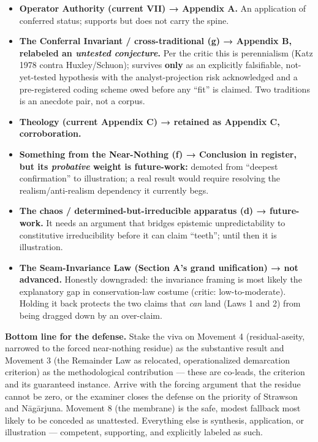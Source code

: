 \documentclass[11pt]{article}
\begin{document}
\begin{itemize}
\item \textbf{Operator Authority (current VII) → Appendix A.} An application of conferred status; supports but does not carry the spine.
\item \textbf{The Conferral Invariant /\allowbreak{} cross-traditional (g) → Appendix B, relabeled an \emph{untested conjecture}.} Per the critic this is perennialism (Katz 1978 contra Huxley/\allowbreak{}Schuon); survives \textbf{only} as an explicitly falsifiable, not-yet-tested hypothesis with the analyst-projection risk acknowledged and a pre-registered coding scheme owed before any ``fit'' is claimed. Two traditions is an anecdote pair, not a corpus.
\item \textbf{Theology (current Appendix C) → retained as Appendix C, corroboration.}
\item \textbf{Something from the Near-Nothing (f) → Conclusion in register, but its \emph{probative} weight is future-work:} demoted from ``deepest confirmation'' to illustration; a real result would require resolving the realism/\allowbreak{}anti-realism dependency it currently begs.
\item \textbf{The chaos /\allowbreak{} determined-but-irreducible apparatus (d) → future-work.} It needs an argument that bridges epistemic unpredictability to constitutive irreducibility before it can claim ``teeth''; until then it is illustration.
\item \textbf{The Seam-Invariance Law (Section A's grand unification) → not advanced.} Honestly downgraded: the invariance framing is most likely the explanatory gap in conservation-law costume (critic: low-to-moderate). Holding it back protects the two claims that \emph{can} land (Laws 1 and 2) from being dragged down by an over-claim.
\end{itemize}

\textbf{Bottom line for the defense.} Stake the viva on Movement 4 (residual-aseity, narrowed to the forced near-nothing residue) as the substantive result and Movement 3 (the Remainder Law as relocated, operationalized demarcation criterion) as the methodological contribution — these are co-leads, the criterion and its guaranteed instance. Arrive with the forcing argument that the residue cannot be zero, or the examiner closes the defense on the priority of Strawson and Nāgārjuna. Movement 8 (the membrane) is the safe, modest fallback most likely to be conceded as unattested. Everything else is synthesis, application, or illustration — competent, supporting, and explicitly labeled as such.
\end{document}
